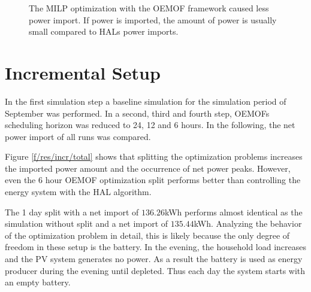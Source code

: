 \documentclass[a4paper,12pt]{book}
\theoremstyle{break}
\begin{document}
\begin{figure}[htp]
 \centering
{}%
\qquad
{}%
\caption{The \ac{MILP} optimization with the \ac{OEMOF} framework caused less power import. If power is imported, the amount of power is usually small compared to HALs power imports.}%
\label{f/res/baseline/total}%
\end{figure}


\newpage
\section{Incremental Setup}
In the first simulation step a baseline simulation for the simulation period of September was performed.
In a second, third and fourth step, \ac{OEMOF}s scheduling horizon was reduced to 24, 12 and 6 hours. In the following, the net power import of all runs was compared.

Figure \ref{f/res/incr/total} shows that splitting the optimization problems increases the imported power amount and the occurrence of net power peaks. However, even the 6 hour \ac{OEMOF} optimization split performs better than controlling the energy system with the HAL algorithm.
	
The 1 day split with a net import of $136.26$kWh performs almost identical as the simulation without split and a net import of $135.44$kWh. Analyzing the behavior of the optimization problem in detail, this is likely because the only degree of freedom in these setup is the battery. 
In the evening, the household load increases and the \ac{PV} system generates no power. As a result the battery is used as energy producer during the evening until depleted. Thus each day the system starts with an empty battery.
\end{document}
